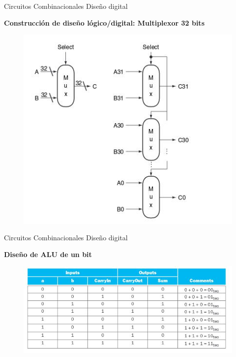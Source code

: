 \documentclass[aspectratio=169,compress]{beamer}
\begin{document}
\begin{footnotesize}
\begin{frame} {Circuitos Combinacionales} {Diseño digital}
\begin{center}\textbf{Construcción de diseño lógico/digital: Multiplexor 32 bits}\end{center}
\begin{figure}
\includegraphics[scale=0.4]{images/multiplexor32bits.jpg} 
\end{figure}
\end{frame}




\begin{frame} {Circuitos Combinacionales} {Diseño digital}
\begin{center}\textbf{Diseño de ALU de un bit}\end{center}
\begin{figure}
\includegraphics[scale=0.4]{images/alu1bit.jpg} 
\end{figure}
\end{frame}





\end{footnotesize}
\end{document}
